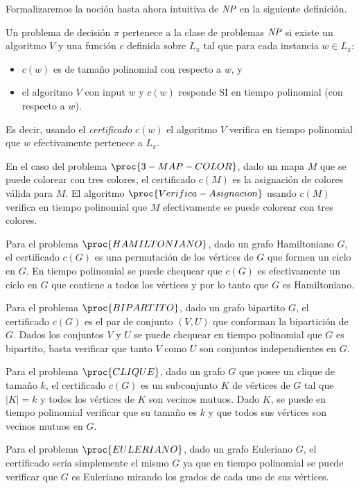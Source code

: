 Formalizaremos la noción hasta ahora intuitiva de $\emph{NP}$ en la siguiente definición.

\begin{definicion}
Un problema de decisión $\pi$ pertenece a la clase de problemas $\emph{NP}$ si 
existe un algoritmo $V$ y una funci\'on $c$ definida sobre $L_\pi$ tal que
para cada instancia $w\in L_\pi$:
\begin{itemize}
\item $c(w)$ es de tamaño polinomial con respecto a $w$, y 
\item el algoritmo $V$ con input $w$ y $c(w)$ responde SI en tiempo polinomial (con respecto a $w$).
\end{itemize}
Es decir, usando el \emph{certificado} $c(w)$ el algoritmo $V$ verifica
en tiempo polinomial que $w$ efectivamente pertenece a $L_\pi$.
\end{definicion}

\begin{ejemplo}
En el caso del problema $\proc{3-MAP-COLOR}$, dado un mapa $M$ que se puede colorear con tres colores, el certificado $c(M)$ es la asignación de colores válida para $M$.
El algoritmo $\proc{Verifica-Asignacion}$ usando $c(M)$ verifica en tiempo polinomial que $M$ efectivamente se puede colorear con tres colores.

Para el problema $\proc{HAMILTONIANO}$, dado un grafo Hamiltoniano $G$, el certificado $c(G)$ es una permutación de los vértices de $G$ que formen un ciclo en $G$.
En tiempo polinomial se puede chequear que $c(G)$ es efectivamente un ciclo en $G$ que contiene a todos los vértices y por lo tanto que $G$ es Hamiltoniano.

Para el problema $\proc{BIPARTITO}$, dado un grafo bipartito $G$, el certificado $c(G)$ es el par de conjunto $(V,U)$ que conforman la bipartición de $G$.
Dados los conjuntos $V$ y $U$ se puede chequear en tiempo polinomial que $G$ es bipartito, basta verificar que tanto $V$ como $U$ son conjuntos independientes en $G$.

Para el problema $\proc{CLIQUE}$, dado un grafo $G$ que posee un clique de tamaño $k$, el certificado $c(G)$ es un subconjunto $K$ de vértices de $G$ tal que $|K|=k$ y todos los vértices de $K$ son vecinos mutuos.
Dado $K$, se puede en tiempo polinomial verificar que su tamaño es $k$ y que todos sus vértices son vecinos mutuos en $G$.

Para el problema $\proc{EULERIANO}$, dado un grafo Euleriano $G$, el certificado sería simplemente el mismo $G$ ya que en tiempo polinomial se puede verificar que $G$ es Euleriano mirando los grados de cada uno de sus vértices.
\end{ejemplo}

